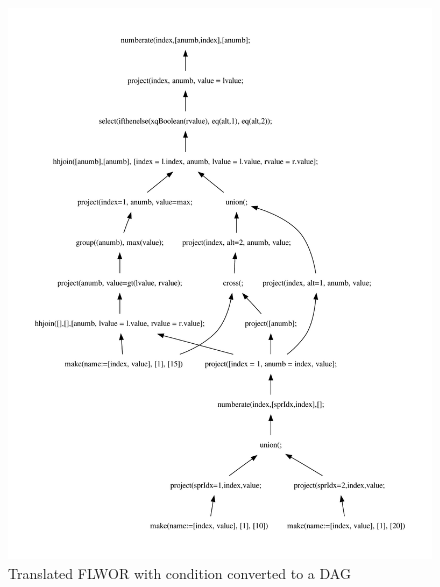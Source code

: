 \newpage
\begin{figure}[!htp]
\begin{center} 
  \includegraphics[width=1.0\textwidth]{img/graphs/td_impl_flwor_ifthenelse_xq_relalg_dag}
  \caption{Translated FLWOR with condition converted to a DAG}
  \label{fig:results:query_conditional_flwor_result_dag}
\end{center}
\end{figure}